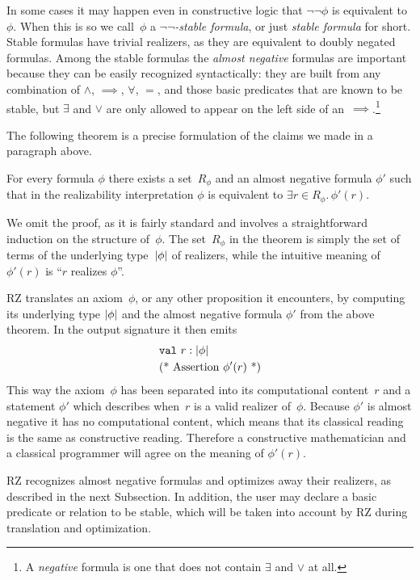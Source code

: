 In some cases it may happen even in constructive logic that
$\lnot\lnot\phi$ is equivalent to~$\phi$. When this is so we
call~$\phi$ a \emph{$\lnot\lnot$-stable formula}, or just \emph{stable
  formula} for short. Stable formulas have trivial realizers, as they
are equivalent to doubly negated formulas. Among the stable formulas
the \emph{almost negative} formulas are important because they can be
easily recognized syntactically: they are built from any combination
of $\land$, $\implies$, $\forall$, $=$, and those basic predicates
that are known to be stable, but $\exists$ and $\lor$ are only allowed
to appear on the left side of an~$\implies$.\footnote{A
  \emph{negative} formula is one that does not contain $\exists$ and
  $\lor$ at all.}

The following theorem is a precise formulation of the claims we made
in a paragraph above.

\begin{theorem}
  For every formula $\phi$ there exists a set~$R_\phi$ and an almost
  negative formula $\phi'$ such that in the realizability
  interpretation $\phi$ is equivalent to $\exists r \in R_\phi . \,
  \phi'(r)$.
\end{theorem}

We omit the proof, as it is fairly standard and involves a
straightforward induction on the structure of~$\phi$. The set~$R_\phi$
in the theorem is simply the set of terms of the underlying
type~$|\phi|$ of realizers, while the intuitive meaning of
$\phi'(r)$ is ``$r$ realizes $\phi$''.

RZ translates an axiom~$\phi$, or any other proposition it encounters,
by computing its underlying type $|\phi|$ and the almost negative
formula $\phi'$ from the above theorem. In the output signature it
then emits
%
\begin{align*}
  & \mathtt{val}\ r : |\phi| \\
  & \text{(* Assertion $\phi'(r)$ *)}
\end{align*}
%
This way the axiom~$\phi$ has been separated into its computational
content~$r$ and a statement $\phi'$ which describes when~$r$ is a
valid realizer of~$\phi$. Because $\phi'$ is almost negative it has no
computational content, which means that its classical reading is the
same as constructive reading. Therefore a constructive mathematician
and a classical programmer will agree on the meaning of $\phi'(r)$.

RZ recognizes almost negative formulas and optimizes away their
realizers, as described in the next Subsection. In addition, the user
may declare a basic predicate or relation to be stable, which will be
taken into account by RZ during translation and optimization.

